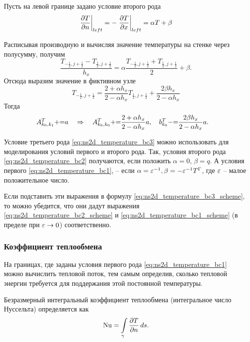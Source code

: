 Пусть на левой границе задано условие второго рода
\begin{equation}
\label{eq:ns2d_temperature_bc3}
\left.\frac{\partial T}{\partial n}\right|_{left} = -\left. \frac{\partial T}{\partial x} \right|_{left} = \alpha T + \beta
\end{equation}

Расписывая производную и вычисляя значение температуры на стенке через полусумму, получим
$$
\frac{T_{-\tfrac12, j+\tfrac12} - T_{\tfrac12, j+\tfrac12}}{h_x} = \alpha \frac{T_{-\tfrac12, j+\tfrac12} + T_{\tfrac12, j+\tfrac12}}{2} + \beta.
$$
Отсюда выразим значение в фиктивном узле
$$
T_{-\tfrac12, j+\tfrac12} = \frac{2 + \alpha h_x}{2-\alpha h_x} T_{\tfrac12, j+\tfrac12} + \frac{2\beta h_x}{2 - \alpha h_x}
$$
Тогда
\begin{align}
\label{eq:ns2d_temperature_bc3_scheme}
&A^T_{k_0, k_1} {{+}{=}} a \quad\Rightarrow\quad
     A^T_{k_0, k_0} {{+}{=}} \frac{2 + \alpha h_x}{2 - \alpha h_x} a, \quad b^T_{k_0} {{-}{=}} \frac{2 \beta h_x}{2 - \alpha h_x} a.
\end{align}

Условие третьего рода \cref{eq:ns2d_temperature_bc3} можно использовать для моделирования условий первого и второго рода.
Так, условия второго рода \cref{eq:ns2d_temperature_bc2} получаются, если положить $\alpha = 0$, $\beta = q$.
А условия первого \cref{eq:ns2d_temperature_bc1}, -- если $\alpha = \varepsilon^{-1}, \beta = -\varepsilon^{-1}T^\Gamma$, где $\varepsilon$ -- малое положительное число.

Если подставить эти выражения в формулу \cref{eq:ns2d_temperature_bc3_scheme}, то можно убедится,
что они дадут выражения \cref{eq:ns2d_temperature_bc2_scheme} и \cref{eq:ns2d_temperature_bc1_scheme} (в пределе при $\varepsilon \to 0$)
соответственно.

\subsubsection{Коэффициент теплообмена}
На границах, где заданы условия первого рода \cref{eq:ns2d_temperature_bc1}
можно вычислить тепловой поток, тем самым
определив, сколько тепловой энергии требуется для
поддержания этой постоянной температуры.

Безразмерный интегральный коэффициент теплообмена (интегральное число Нуссельта) определяется как
\begin{equation}
\label{eq:integral_nu}
\mathrm{Nu} = \displaystyle\int\limits_{\gamma}\frac{\partial T}{\partial n} \, d s.
\end{equation}

